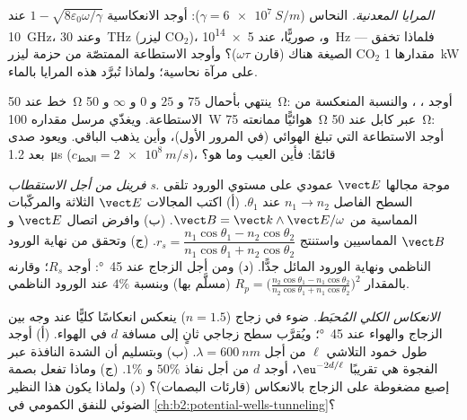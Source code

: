 \begin{exercise}[$\star\star$]\label{exo:b2:wave-interfaces:8}
\emph{المرايا المعدنية.} النحاس ($\gamma = \qty{6e7}{S/m}$): أوجد الانعكاسية $1 -
\sqrt{8\varepsilon_0\omega/\gamma}$ عند \qty{10}{GHz}، وعند \qty{30}{THz} (ليزر CO$_2$)، و،
صوريًّا، عند \qty{5e14}{Hz} --- فلماذا تخفق الصيغة هناك (قارن
$\omega\tau$)؟ وأوجد الاستطاعة الممتصّة من حزمة ليزر CO$_2$ مقدارها \qty{1}{kW} على مرآة
نحاسية؛ ولماذا تُبرَّد هذه المرايا بالماء.
\end{exercise}

\begin{exercise}[$\star\star$]\label{exo:b2:wave-interfaces:9}
خط عند \qty{50}{\ohm} ينتهي بأحمال $75$ و $25$ و $0$ و $\infty$ و \qty{50}{\ohm}:
أوجد ، ، والنسبة المنعكسة من الاستطاعة.
ويغذّي مرسل مقداره \qty{100}{W} هوائيًّا ممانعته \qty{75}{\ohm}
عبر كابل عند \qty{50}{\ohm}: أوجد الاستطاعة التي تبلغ الهوائي (في المرور الأول)،
وأين يذهب الباقي. ويعود صدى بعد \qty{1.2}{\micro s} ($c_{\text{الخط}}
= \qty{2e8}{m/s}$)، قائمًا: فأين العيب وما هو؟
\end{exercise}

\begin{exercise}[$\star\star\star$]\label{exo:b2:wave-interfaces:10}
\emph{فرينل من أجل الاستقطاب s.} موجة مجالها $\vect E$ عمودي
على مستوي الورود تلقى السطح الفاصل $n_1 \to n_2$ عند $\theta_1$.
(أ) اكتب المجالات $\vect E$ الثلاثة والمركّبات المماسية من
$\vect B = \vect k\wedge\vect E/\omega$. (ب) وافرض اتصال $\vect E$ و $\vect B$
المماسيين واستنتج $r_s = \dfrac{n_1\cos\theta_1 - n_2\cos\theta_2}
{n_1\cos\theta_1 + n_2\cos\theta_2}$. (ج) وتحقق من نهاية الورود الناظمي ونهاية
الورود المائل جدًّا. (د) ومن أجل الزجاج عند \qty{45}{\degree}: أوجد $R_s$؛ وقارنه بالمقدار $R_p
= \bigl(\frac{n_2\cos\theta_1 - n_1\cos\theta_2}{n_2\cos\theta_1 + n_1\cos\theta_2}\bigr)^2$
(مسلَّم بها) وبنسبة $4\%$ عند الورود الناظمي.
\end{exercise}

\begin{exercise}[$\star\star\star$]\label{exo:b2:wave-interfaces:11}
\emph{الانعكاس الكلي المُحبَط.} ضوء في زجاج ($n = 1.5$) ينعكس
انعكاسًا كليًّا عند وجه بين الزجاج والهواء عند \qty{45}{\degree}؛ ويُقرَّب سطح زجاجي
ثانٍ إلى مسافة $d$ في الهواء. (أ) أوجد طول خمود
التلاشي $\ell$ من أجل $\lambda = \qty{600}{nm}$. (ب) وبتسليم أن الشدة
النافذة عبر الفجوة هي تقريبًا $\eu^{-2d/\ell}$، أوجد $d$ من أجل نفاذ $50\%$
و $1\%$. (ج) وماذا تفعل بصمة إصبع مضغوطة على الزجاج
بالانعكاس (قارئات البصمات)؟ (د) ولماذا يكون هذا النظير
الضوئي للنفق الكمومي في
\cref{ch:b2:potential-wells-tunneling}؟
\end{exercise}

